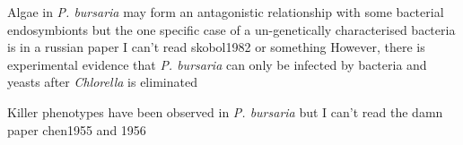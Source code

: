 Algae in \textit{P. bursaria} may form an antagonistic relationship with some bacterial endosymbionts but the one specific case
of a un-genetically characterised bacteria is in a russian paper I can't read skobol1982 or something 
However, there is experimental evidence that \textit{P. bursaria} can only be infected by bacteria and yeasts after
\textit{Chlorella} is eliminated \citep{Gortz1982}

Killer phenotypes have been observed in \textit{P. bursaria} but I can't read the damn paper chen1955 and 1956 \citep{Gortz2009}

%
